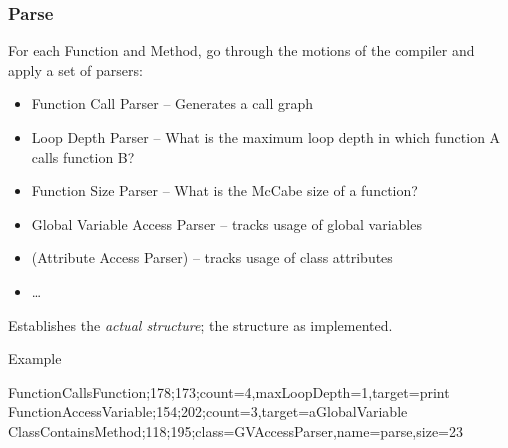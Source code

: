 \documentclass[10pt]{beamer}
\begin{document}
\begin{frame}[t]
\frametitle{Parse}

For each Function and Method, go through the motions of the compiler and apply a set of parsers:
\begin{itemize}
\item Function Call Parser -- Generates a call graph
\item Loop Depth Parser -- What is the maximum loop depth in which function A calls function B?
\item Function Size Parser -- What is the McCabe size of a function?
\item Global Variable Access Parser -- tracks usage of global variables
\item (Attribute Access Parser) -- tracks usage of class attributes
\item \ldots
\end{itemize}

Establishes the \emph{actual structure}; the structure as implemented.

\begin{exampleblock}{Example}
\begin{scriptsize}
FunctionCallsFunction;178;173;count=4,maxLoopDepth=1,target=print\\
FunctionAccessVariable;154;202;count=3,target=aGlobalVariable\\
ClassContainsMethod;118;195;class=GVAccessParser,name=parse,size=23\\
\end{scriptsize}
\end{exampleblock}

\end{frame}
\end{document}
